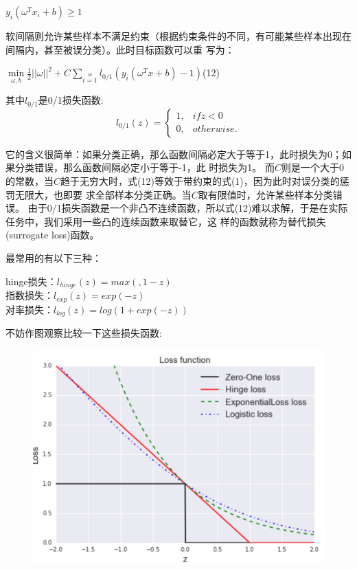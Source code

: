 \documentclass[UTF8]{ctexart}
\begin{document}
{\begin{center}
    \Large{
        $y_i(\omega^Tx_i+b)\geq 1$
    }
\end{center}\par
软间隔则允许某些样本不满足约束（根据约束条件的不同，有可能某些样本出现在间隔内，甚至被误分类）。此时目标函数可以重
写为：
\begin{center}
    \Large{
        $\min\limits_{\omega,b}\frac{1}{2}||\omega||^2+C\sum\limits_{i=1}\limits^ml_{0/1}(y_i(\omega^Tx+b)-1)$\quad(12)
    }
\end{center}
其中$l_{0/1}$是0/1损失函数:
$$l_{0/1}(z)=\left\{
\begin{aligned}
    1,&if z<0\\
    0,&otherwise.
\end{aligned}    
\right.
$$\par
它的含义很简单：如果分类正确，那么函数间隔必定大于等于1，此时损失为0；如果分类错误，那么函数间隔必定小于等于-1，此
时损失为1。
而$C$则是一个大于0的常数，当$C$趋于无穷大时，式(12)等效于带约束的式(1)，因为此时对误分类的惩罚无限大，也即要
求全部样本分类正确。当$C$取有限值时，允许某些样本分类错误。
由于0/1损失函数是一个非凸不连续函数，所以式(12)难以求解，于是在实际任务中，我们采用一些凸的连续函数来取替它，这
样的函数就称为替代损失(surrogate loss)函数。\par
最常用的有以下三种：
\begin{center}
    hinge损失：$l_{hinge}(z)=max(,1-z)$\\
    指数损失：$l_{exp}(z)=exp(-z)$\phantom{aaaaaaa}\\
   对率损失：$l_{log}(z)=log(1+exp(-z))$\par
\end{center}
不妨作图观察比较一下这些损失函数:
\begin{figure}[ht]
    \centering
    \includegraphics[scale=0.5]{06.png}

\end{figure}}
\end{document}
